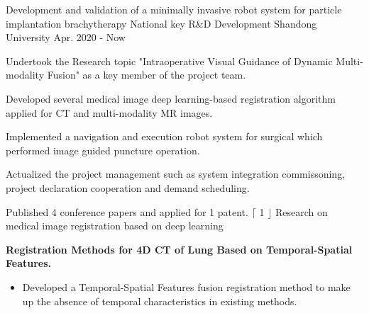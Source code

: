 

\begin{cventries}
  \cventry
    {Development and validation of a minimally invasive robot system for particle implantation brachytherapy} %
    {National key R\&D Development} %
    {Shandong University} %
    {Apr. 2020 - Now} %
    {
      \begin{cvitems} %
        \item {Undertook the Research topic "Intraoperative Visual Guidance of Dynamic Multi-modality Fusion" as a key member of the project team.}
        \item {Developed several medical image deep learning-based registration algorithm applied for CT and multi-modality MR images.}
        \item {Implemented a navigation and execution robot system for surgical which performed image guided puncture operation. }
        \item {Actualized the project management such as system integration commissoning, project declaration cooperation and demand scheduling.}
      \end{cvitems}
    }
  \cventry
    {Published 4 conference papers and applied for 1 patent. } %
    {$\lceil$ 1 $\rfloor$ Research on medical image registration based on deep learning} %
    {} %
    {} %
    {
      \textbf{Registration Methods for 4D CT of Lung Based on Temporal-Spatial Features.}
      \begin{itemize}[leftmargin=*]
        \item Developed a Temporal-Spatial Features fusion registration method to make up the absence of temporal characteristics in existing methods.

\end{itemize}}
\end{cventries}
